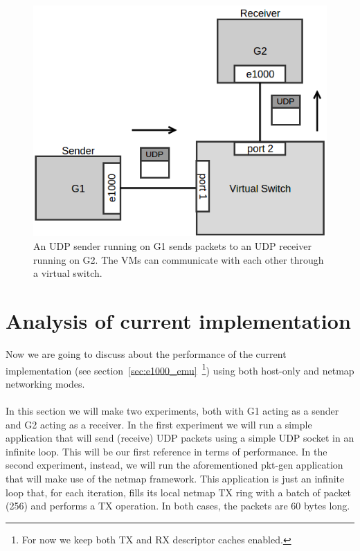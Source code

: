 \documentclass[a4paper, 12pt, titlepage]{report}
\begin{document}
\begin{figure}[!t]
	\centering
	\includegraphics[scale=0.5]{img/g2g_comm.png}
	\caption{An UDP sender running on G1 sends packets to an UDP receiver running on G2. The VMs can communicate with each other through a virtual switch.}
	\label{img:g2g_comm}
\end{figure}
\section{Analysis of current implementation}
Now we are going to discuss about the performance of the current implementation (see section~\ref{sec:e1000_emu}~\footnote{For now we keep both TX and RX descriptor caches enabled.}) using both host-only and netmap networking modes.
\\
\\
In this section we will make two experiments, both with G1 acting as a sender and G2 acting as a receiver. In the first experiment we will run a simple application that will send (receive) UDP packets using a simple UDP socket in an infinite loop. This will be our first reference in terms of performance. In the second experiment, instead, we will run the aforementioned pkt-gen application that will make use of the netmap framework. This application is just an infinite loop that, for each iteration, fills its local netmap TX ring with a batch of packet (256) and performs a TX operation. In both cases, the packets are 60 bytes long.
\end{document}
